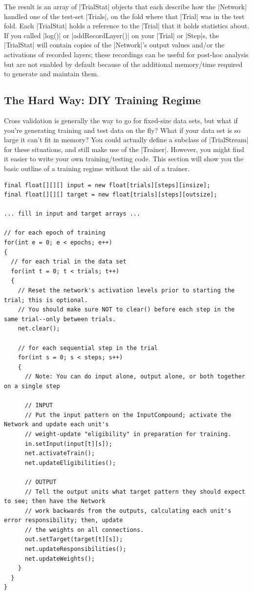 \documentclass{article}
\begin{document}
The result is an array of |TrialStat| objects that each describe how the |Network| handled one of the test-set |Trials|, on the fold where that |Trial| was in the test fold. Each  |TrialStat| holds a reference to the |Trial| that it holds statistics about. If you called |log()|
or |addRecordLayer()| on your |Trial| or  |Step|s, the |TrialStat| will contain copies of the |Network|'s
output values and/or the activations of recorded layers; these recordings can be useful for post-hoc
analysis but are not enabled by default because of the additional memory/time required to generate
and maintain them.


\subsection{The Hard Way: DIY Training Regime}

Cross validation is generally the way to go for fixed-size data sets, but what if you're generating
training and test data on the fly? What if your data set is so large it can't fit in memory? You
could actually define a subclass of |TrialStream| for these situations, and still make use of the
|Trainer|. However, you might find it easier to write your own training/testing code. This 
section will show you the basic outline of a training regime without the aid of a trainer.

\begin{verbatim}
final float[][][] input = new float[trials][steps][insize];
final float[][][] target = new float[trials][steps][outsize];

... fill in input and target arrays ...

// for each epoch of training
for(int e = 0; e < epochs; e++)
{
  // for each trial in the data set
  for(int t = 0; t < trials; t++)
  {
    // Reset the network's activation levels prior to starting the trial; this is optional.
    // You should make sure NOT to clear() before each step in the same trial--only between trials.
    net.clear();
    
    // for each sequential step in the trial
    for(int s = 0; s < steps; s++)
    {
      // Note: You can do input alone, output alone, or both together on a single step
    
      // INPUT
      // Put the input pattern on the InputCompound; activate the Network and update each unit's
      // weight-update "eligibility" in preparation for training.
      in.setInput(input[t][s]);
      net.activateTrain();
      net.updateEligibilities();
      
      // OUTPUT
      // Tell the output units what target pattern they should expect to see; then have the Network
      // work backwards from the outputs, calculating each unit's error responsibility; then, update
      // the weights on all connections.
      out.setTarget(target[t][s]);
      net.updateResponsibilities();
      net.updateWeights();
    }
  }
}
\end{verbatim}
\end{document}
